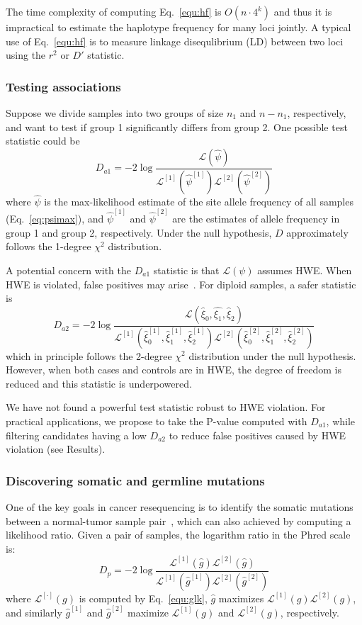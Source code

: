 \documentclass{bioinfo}
\begin{document}
\begin{methods}
The time complexity of computing Eq.~\eqref{equ:hf} is $O(n\cdot 4^k)$ and thus
it is impractical to estimate the haplotype frequency for many loci jointly.  A
typical use of Eq.~\eqref{equ:hf} is to measure linkage disequlibrium (LD)
between two loci using the $r^2$ or $D'$ statistic.

\subsubsection{Testing associations}
Suppose we divide samples into two groups of size $n_1$ and $n-n_1$,
respectively, and want to test if group 1 significantly differs from group 2.
One possible test statistic could be
\begin{equation}\label{eq:asso1}
D_{a1}=-2\log\frac{\mathcal{L}(\hat{\psi})}{\mathcal{L}^{[1]}(\hat{\psi}^{[1]})\mathcal{L}^{[2]}(\hat{\psi}^{[2]})}
\end{equation}
where $\hat{\psi}$ is the max-likelihood estimate of the site allele frequency
of all samples (Eq.~\eqref{eq:psimax}), and $\hat{\psi}^{[1]}$ and
$\hat{\psi}^{[2]}$ are the estimates of allele frequency in group 1 and group
2, respectively.  Under the null hypothesis, $D$ approximately follows the
1-degree $\chi^2$ distribution.

A potential concern with the $D_{a1}$ statistic is that $\mathcal{L}(\psi)$
assumes HWE.  When HWE is violated, false positives may
arise~\citep{Nielsen:2011fk}. For diploid samples, a safer statistic is
$$
D_{a2}=-2\log\frac{\mathcal{L}(\hat{\xi}_0,\hat{\xi_1},\hat{\xi}_2)}
{\mathcal{L}^{[1]}(\hat{\xi}_0^{[1]},\hat{\xi}_1^{[1]},\hat{\xi}_2^{[1]})\mathcal{L}^{[2]}(\hat{\xi}_0^{[2]},\hat{\xi}_1^{[2]},\hat{\xi}_2^{[2]})}
$$
which in principle follows the 2-degree $\chi^2$ distribution under the null
hypothesis.  However, when both cases and controls are in HWE, the degree of
freedom is reduced and this statistic is underpowered.

We have not found a powerful test statistic robust to HWE violation. For
practical applications, we propose to take the P-value computed with $D_{a1}$,
while filtering candidates having a low $D_{a2}$ to reduce false positives
caused by HWE violation (see Results).

\subsubsection{Discovering somatic and germline mutations}
One of the key goals in cancer resequencing is to identify the somatic
mutations between a normal-tumor sample pair~\citep{Robison:2010ys}, which can
also achieved by computing a likelihood ratio.  Given a pair of samples, the
logarithm ratio in the Phred scale is:
\begin{equation}\label{eq:dp}
D_p=-2\log\frac{\mathcal{L}^{[1]}(\hat{g})\mathcal{L}^{[2]}(\hat{g})}{\mathcal{L}^{[1]}(\hat{g}^{[1]})\mathcal{L}^{[2]}(\hat{g}^{[2]})}
\end{equation}
where $\mathcal{L}^{[\cdot]}(g)$ is computed by Eq.~\eqref{equ:glk}, $\hat{g}$
maximizes $\mathcal{L}^{[1]}(g)\mathcal{L}^{[2]}(g)$, and similarly
$\hat{g}^{[1]}$ and $\hat{g}^{[2]}$ maximize $\mathcal{L}^{[1]}(g)$ and
$\mathcal{L}^{[2]}(g)$, respectively.


\end{methods}
\end{document}
